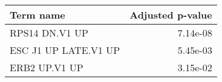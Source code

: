 \begin{tabular}{lr}
\toprule
           Term name &  Adjusted p-value \\
\midrule
      RPS14 DN.V1 UP &          7.14e-08 \\
ESC J1 UP LATE.V1 UP &          5.45e-03 \\
       ERB2 UP.V1 UP &          3.15e-02 \\
\bottomrule
\end{tabular}
